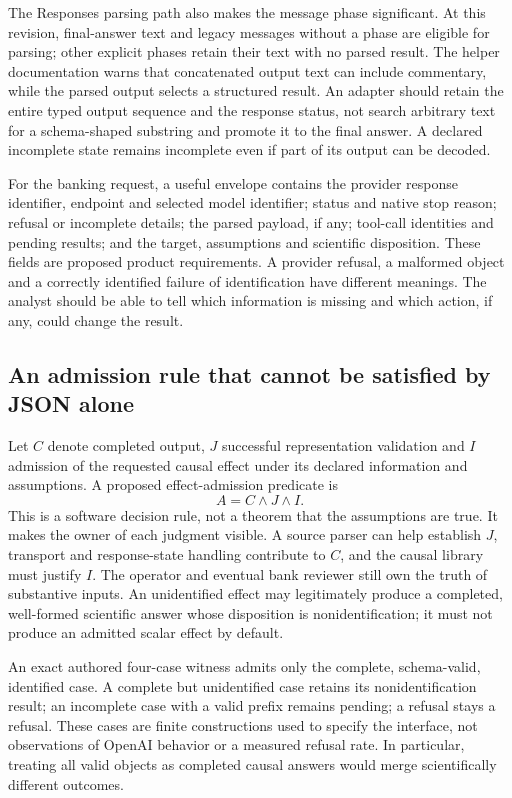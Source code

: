 The Responses parsing path also makes the message phase significant. At this revision, final-answer text and
legacy messages without a phase are eligible for parsing; other explicit phases retain their text with no parsed
result. The helper documentation warns that concatenated output text can include commentary, while the parsed
output selects a structured result. An adapter should retain the entire typed output sequence and the response
status, not search arbitrary text for a schema-shaped substring and promote it to the final answer. A declared
incomplete state remains incomplete even if part of its output can be decoded.\citep{exec28_oa_sdk}

For the banking request, a useful envelope contains the provider response identifier, endpoint and selected
model identifier; status and native stop reason; refusal or incomplete details; the parsed payload, if any;
tool-call identities and pending results; and the target, assumptions and scientific disposition. These fields
are proposed product requirements. A provider refusal, a malformed object and a correctly identified failure
of identification have different meanings. The analyst should be able to tell which information is missing
and which action, if any, could change the result.

\subsection{An admission rule that cannot be satisfied by JSON alone}
Let \(C\) denote completed output, \(J\) successful representation validation and \(I\) admission of the
requested causal effect under its declared information and assumptions. A proposed effect-admission predicate is
\[
 A=C\land J\land I.
\]
This is a software decision rule, not a theorem that the assumptions are true. It makes the owner of each
judgment visible. A source parser can help establish \(J\), transport and response-state handling contribute to
\(C\), and the causal library must justify \(I\). The operator and eventual bank reviewer still own the truth
of substantive inputs. An unidentified effect may legitimately produce a completed, well-formed scientific
answer whose disposition is nonidentification; it must not produce an admitted scalar effect by default.

An exact authored four-case witness admits only the complete, schema-valid, identified case. A complete but
unidentified case retains its nonidentification result; an incomplete case with a valid prefix remains pending;
a refusal stays a refusal. These cases are finite constructions used to specify the interface, not observations
of OpenAI behavior or a measured refusal rate. In particular, treating all valid objects as completed causal
answers would merge scientifically different outcomes.\citep{exec28_oa_reference}

